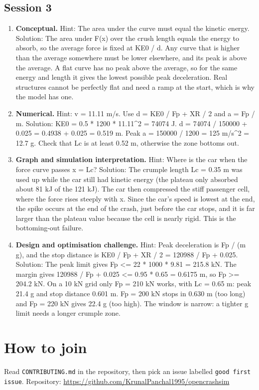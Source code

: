 \documentclass[11pt,a4paper]{article}
\begin{document}
\subsection*{Session 3}
\begin{enumerate}[nosep]
\item \textbf{Conceptual.} Hint: The area under the curve must equal the kinetic energy. Solution: The area under F(x) over the crush length equals the energy to absorb, so the average force is fixed at KE0 / d. Any curve that is higher than the average somewhere must be lower elsewhere, and its peak is above the average. A flat curve has no peak above the average, so for the same energy and length it gives the lowest possible peak deceleration. Real structures cannot be perfectly flat and need a ramp at the start, which is why the model has one.
\item \textbf{Numerical.} Hint: v = 11.11 m/s. Use d = KE0 / Fp + XR / 2 and a = Fp / m. Solution: KE0 = 0.5 * 1200 * 11.11\textasciicircum{}2 = 74074 J. d = 74074 / 150000 + 0.025 = 0.4938 + 0.025 = 0.519 m. Peak a = 150000 / 1200 = 125 m/s\textasciicircum{}2 = 12.7 g. Check that Lc is at least 0.52 m, otherwise the zone bottoms out.
\item \textbf{Graph and simulation interpretation.} Hint: Where is the car when the force curve passes x = Lc? Solution: The crumple length Lc = 0.35 m was used up while the car still had kinetic energy (the plateau only absorbed about 81 kJ of the 121 kJ). The car then compressed the stiff passenger cell, where the force rises steeply with x. Since the car's speed is lowest at the end, the spike occurs at the end of the crash, just before the car stops, and it is far larger than the plateau value because the cell is nearly rigid. This is the bottoming-out failure.
\item \textbf{Design and optimisation challenge.} Hint: Peak deceleration is Fp / (m g), and the stop distance is KE0 / Fp + XR / 2 = 120988 / Fp + 0.025. Solution: The peak limit gives Fp \textless{}= 22 * 1000 * 9.81 = 215.8 kN. The margin gives 120988 / Fp + 0.025 \textless{}= 0.95 * 0.65 = 0.6175 m, so Fp \textgreater{}= 204.2 kN. On a 10 kN grid only Fp = 210 kN works, with Lc = 0.65 m: peak 21.4 g and stop distance 0.601 m. Fp = 200 kN stops in 0.630 m (too long) and Fp = 220 kN gives 22.4 g (too high). The window is narrow: a tighter g limit needs a longer crumple zone.
\end{enumerate}

\section{How to join}
Read \texttt{CONTRIBUTING.md} in the repository, then pick an issue labelled \texttt{good first issue}. Repository: \url{https://github.com/KrunalPanchal1995/opencrashsim}
\end{document}
